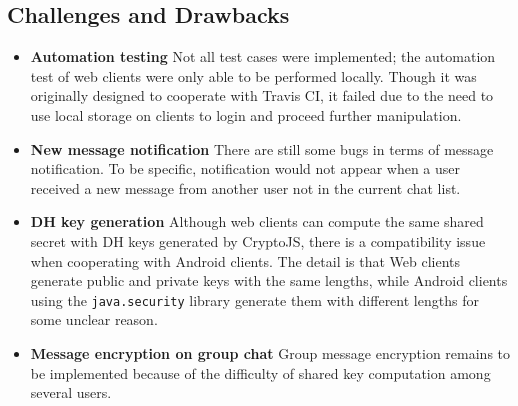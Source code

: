 \subsection{Challenges and Drawbacks}

\begin{itemize}
    \item \textbf{Automation testing} Not all test cases were implemented; the automation test of web clients were only able to be performed locally. Though it was originally designed to cooperate with Travis CI, it failed due to the need to use local storage on clients to login and proceed further manipulation.
    \item \textbf{New message notification} There are still some bugs in terms of message notification. To be specific, notification would not appear when a user received a new message from another user not in the current chat list.
    \item \textbf{DH key generation} Although web clients can compute the same shared secret with DH keys generated by CryptoJS, there is a compatibility issue when cooperating with Android clients. The detail is that Web clients generate public and private keys with the same lengths, while Android clients using the \verb|java.security| library generate them with different lengths for some unclear reason.
    \item \textbf{Message encryption on group chat} Group message encryption remains to be implemented because of the difficulty of shared key computation among several users.
\end{itemize}